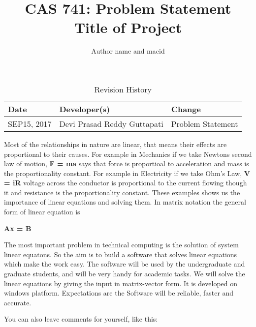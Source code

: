 \documentclass{article}
\title{CAS 741: Problem Statement\\Title of Project}
\author{Author name and macid}
\date{}
\begin{document}
\maketitle

\begin{table}[hp]
\caption{Revision History} \label{TblRevisionHistory}
\begin{tabularx}{\textwidth}{llX}
\toprule
\textbf{Date} & \textbf{Developer(s)} & \textbf{Change}\\
\midrule
SEP15, 2017 & Devi Prasad Reddy Guttapati & Problem Statement\\

\bottomrule
\end{tabularx}
\end{table}

Most of the relationships in nature are linear, that means their effects are proportional to their causes. For example in Mechanics if we take Newtons second law of motion, \textbf{F = ma} says that force is proportioal to acceleration and mass is the proportionality constant. For example in Electricity if we take Ohm's Law, \textbf{V = iR} voltage across the conductor is proportional to the current flowing though it and resistance is the proportionality constant. These  examples shows us the importance of linear equations and solving them. In matrix notation the general form of linear equation is

 \centerline{\textbf{Ax = B}}

The most important problem in technical computing is the solution of system linear equatons. So the aim is to build a software that solves linear equations which make the work easy. The software will be used by the undergraduate and graduate students, and will be very handy for academic tasks. We will solve the linear equations by giving the input in matrix-vector form. It is developed on windows platform. Expectations are the Software will be reliable, faster and accurate.




                                                                                   
                                                                                          



You can also leave comments for yourself, like this:

\end{document}
